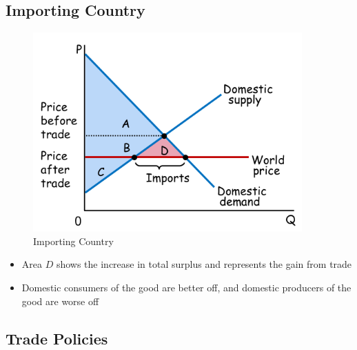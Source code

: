 \documentclass[a4paper,titlepage] {scrartcl}
\begin{document}
\subsection{Importing Country} %
\label{sub:importing_country}
\begin{figure}[htbp]
	\centering
		\includegraphics[height=3in]{images/importCountry.png}
	\caption{Importing Country}
	\label{fig:images_importCountry}
\end{figure}

\begin{itemize}
	\item Area $D$ shows the increase in total surplus and represents the gain from trade
	\item Domestic consumers of the good are better off, and domestic producers of the good are worse off
\end{itemize}


\subsection{Trade Policies} %
\label{sub:trade_policies}
\end{document}
